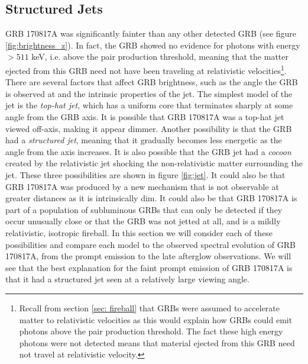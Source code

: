 \documentclass[11pt]{cuthesis}
\begin{document}
\subsection{Structured Jets} \label{sec:structured jets}
GRB 170817A was significantly fainter than any other detected GRB (see figure \ref{fig:brightness_z}). In fact, the GRB showed no evidence for photons with energy $>511$ keV, i.e. above the pair production threshold, meaning that the matter ejected from this GRB need not have been traveling at relativistic velocities\footnote{Recall from section \ref{sec: fireball} that GRBs were assumed to accelerate matter to relativistic velocities as this would explain how GRBs could emit photons above the pair production threshold. The fact these high energy photons were not detected means that material ejected from this GRB need not travel at relativistic velocity.}. There are several factors that affect GRB brightness, such as the angle the GRB is observed at and the intrinsic properties of the jet. The simplest model of the jet is the \textit{top-hat jet}, which has a uniform core that terminates sharply at some angle from the GRB axis. It is possible that GRB 170817A was a top-hat jet viewed off-axis, making it appear dimmer. Another possibility is that the GRB had a \textit{structured jet}, meaning that it gradually becomes less energetic as the angle from the axis increases. It is also possible that the GRB jet had a \textit{cocoon} created by the relativistic jet shocking the non-relativistic matter surrounding the jet. These three possibilities are shown in figure \ref{fig:jet}. It could also be that GRB 170817A was produced by a new mechanism that is not observable at greater distances as it is intrinsically dim. It could also be that GRB 170817A is part of a population of subluminous GRBs that can only be detected if they occur unusually close or that the GRB was not jetted at all, and is a mildly relativistic, isotropic fireball. In this section we will consider each of these possibilities and compare each model to the observed spectral evolution of GRB 170817A, from the prompt emission to the late afterglow observations. We will see that the best explanation for the faint prompt emission of GRB 170817A is that it had a structured jet seen at a relatively large viewing angle. 
\end{document}
